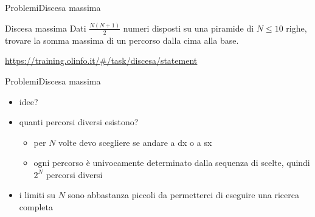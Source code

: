 \documentclass{beamer}
\begin{document}
\begin{frame}{Problemi}{Discesa massima}
    \begin{exampleblock}{Discesa massima}
        Dati $\frac{N(N+1)}{2}$ numeri disposti su una piramide di $N \leq 10$ righe, trovare la somma massima di un percorso dalla cima alla base.
    \end{exampleblock}
    \small{\underline{\url{https://training.olinfo.it/\#/task/discesa/statement}}}
\end{frame}

\begin{frame}{Problemi}{Discesa massima}
    \begin{itemize}
        \item idee?
        \item quanti percorsi diversi esistono?
        \pause
        \begin{itemize}
            \item per $N$ volte devo scegliere se andare a dx o a sx
            \item ogni percorso \`e univocamente determinato dalla sequenza di scelte, quindi $2^N$ percorsi diversi
        \end{itemize}
        \pause
        \item i limiti su $N$ sono abbastanza piccoli da permetterci di eseguire una ricerca completa
    \end{itemize}
\end{frame}
\end{document}
